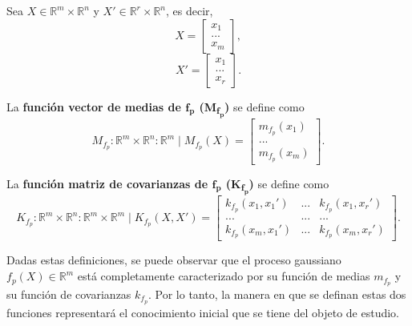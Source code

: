 \begin{defin*}
Sea $X \in \mathbb{R}^m \times \mathbb{R}^n$ y $X' \in \mathbb{R}^r \times \mathbb{R}^n$, es decir,
\begin{equation*}
    X =     
    \left[
        \begin{array}{c}
        x_1  \\
        ... \\
        x_m
        \end{array}
    \right],
\end{equation*}
\begin{equation*}
    X' =     
    \left[
        \begin{array}{c}
        x_1  \\
        ... \\
        x_r
        \end{array}
    \right].
\end{equation*}

La \textbf{función vector de medias de $\bm{f_p}$ (M\textsubscript{$\bm{f_p}$})} se define como
\begin{equation*}
    M_{f_p}: \mathbb{R}^m \times \mathbb{R}^n: \mathbb{R}^m
    \mid
    M_{f_p}(X) =     
    \left[
        \begin{array}{c}
        m_{f_p}(x_1)  \\
        ... \\
        m_{f_p}(x_m)
        \end{array}
    \right].
\end{equation*}

La \textbf{función matriz de covarianzas de $\bm{f_p}$ (K\textsubscript{$\bm{f_p}$})} se define como
\begin{equation*}
    K_{f_p}: \mathbb{R}^m \times \mathbb{R}^n: \mathbb{R}^m \times \mathbb{R}^m
    \mid
    K_{f_p}(X,X') =     
    \left[
        \begin{array}{ccc}
        k_{f_p}(x_1,x_1') & ... & k_{f_p}(x_1,x_r')  \\
        ... & ... & ... \\
        k_{f_p}(x_m,x_1') & ... & k_{f_p}(x_m,x_r')
        \end{array}
    \right].
\end{equation*}
\end{defin*}

Dadas estas definiciones, se puede observar que el proceso gaussiano $f_p(X) \in \mathbb{R}^m$ está completamente caracterizado por su función de medias $m_{f_p}$ y su función de covarianzas $k_{f_p}$. Por lo tanto, la manera en que se definan estas dos funciones representar\'a el conocimiento inicial que se tiene del objeto de estudio. 

